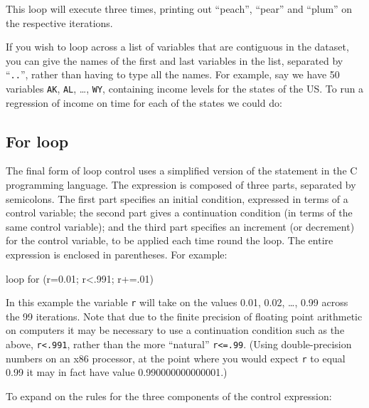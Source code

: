 This loop will execute three times, printing out ``peach'', ``pear''
and ``plum'' on the respective iterations.  

If you wish to loop across a list of variables that are contiguous in
the dataset, you can give the names of the first and last variables in
the list, separated by ``\verb+..+'', rather than having to type all
the names.  For example, say we have 50 variables \verb+AK+,
\verb+AL+, \dots{}, \verb+WY+, containing income levels for the states
of the US.  To run a regression of income on time for each of the
states we could do:



\subsection{For loop}
\label{loop-for}

The final form of loop control uses a simplified version of the
 statement in the C programming language.  The expression is
composed of three parts, separated by semicolons.  The first part
specifies an initial condition, expressed in terms of a control
variable; the second part gives a continuation condition (in terms of
the same control variable); and the third part specifies an increment
(or decrement) for the control variable, to be applied each time round
the loop.  The entire expression is enclosed in parentheses.  For
example:
%
\begin{code}
loop for (r=0.01; r<.991; r+=.01)
\end{code}

In this example the variable \verb+r+ will take on the values 0.01,
0.02, \dots{}, 0.99 across the 99 iterations.  Note that due to the
finite precision of floating point arithmetic on computers it may be
necessary to use a continuation condition such as the above,
\verb+r<.991+, rather than the more ``natural'' \verb+r<=.99+.  (Using
double-precision numbers on an x86 processor, at the point where you
would expect \verb+r+ to equal 0.99 it may in fact have value
0.990000000000001.)

To expand on the rules for the three components of the control
expression:

